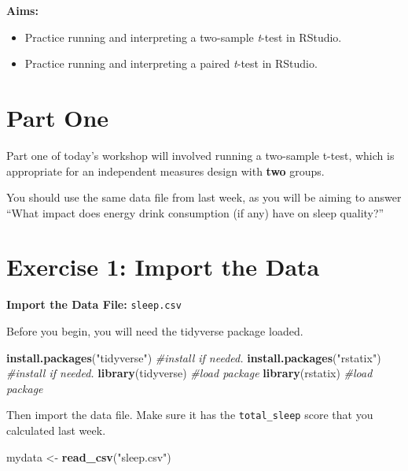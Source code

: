 \documentclass[
]{book}
\newenvironment{Shaded}{\begin{snugshade}}{\end{snugshade}}
\newcommand{\CommentTok}[1]{\textcolor[rgb]{0.56,0.35,0.01}{\textit{#1}}}
\newcommand{\FunctionTok}[1]{\textcolor[rgb]{0.13,0.29,0.53}{\textbf{#1}}}
\newcommand{\NormalTok}[1]{#1}
\newcommand{\OtherTok}[1]{\textcolor[rgb]{0.56,0.35,0.01}{#1}}
\newcommand{\StringTok}[1]{\textcolor[rgb]{0.31,0.60,0.02}{#1}}
\let\oldsection\section
\renewcommand{\section}{\needspace{5\baselineskip}\oldsection}
\begin{document}
\textbf{Aims:}

\begin{itemize}
\item
  Practice running and interpreting a two-sample \emph{t}-test in RStudio.
\item
  Practice running and interpreting a paired \emph{t}-test in RStudio.
\end{itemize}

\section{Part One}\label{part-one}

Part one of today's workshop will involved running a two-sample t-test, which is appropriate for an independent measures design with \textbf{two} groups.

You should use the same data file from last week, as you will be aiming to answer ``What impact does energy drink consumption (if any) have on sleep quality?''

\section{Exercise 1: Import the Data}\label{exercise-1-import-the-data-2}

\textbf{Import the Data File:} \texttt{sleep.csv}

Before you begin, you will need the tidyverse package loaded.

\begin{Shaded}
\begin{Highlighting}[]
\FunctionTok{install.packages}\NormalTok{(}\StringTok{"tidyverse"}\NormalTok{) }\CommentTok{\#install if needed.}
\FunctionTok{install.packages}\NormalTok{(}\StringTok{"rstatix"}\NormalTok{)   }\CommentTok{\#install if needed.}
\FunctionTok{library}\NormalTok{(tidyverse)            }\CommentTok{\#load package}
\FunctionTok{library}\NormalTok{(rstatix)              }\CommentTok{\#load package}
\end{Highlighting}
\end{Shaded}

Then import the data file. Make sure it has the \texttt{total\_sleep} score that you calculated last week.

\begin{Shaded}
\begin{Highlighting}[]
\NormalTok{mydata }\OtherTok{\textless{}{-}} \FunctionTok{read\_csv}\NormalTok{(}\StringTok{"sleep.csv"}\NormalTok{)}
\end{Highlighting}
\end{Shaded}
\end{document}
